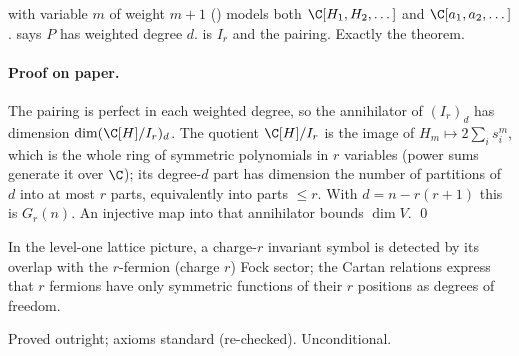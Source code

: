\begin{dictionary}
 with variable $m$ of weight $m+1$ () models both $\C[H_1,H_2,\dots]$ and $\C[a_1,a_2,\dots]$.
 says $P$ has weighted degree $d$.  is $I_r$ and  the pairing.
Exactly the theorem.
\end{dictionary}

\paragraph{Proof on paper.} The pairing is perfect in each weighted degree, so the annihilator of $(I_r)_d$ has dimension
$\dim(\C[H]/I_r)_d$. The quotient $\C[H]/I_r$ is the image of $H_m\mapsto2\sum_is_i^m$, which is the whole ring of symmetric polynomials in $r$
variables (power sums generate it over $\C$); its degree-$d$ part has dimension the number of partitions of $d$ into at most $r$ parts, equivalently
into parts $\le r$. With $d=n-r(r+1)$ this is $G_r(n)$. An injective map into that
annihilator bounds $\dim V$. \qed

\begin{physics}
In the level-one lattice picture, a charge-$r$ invariant symbol is detected by its overlap with the $r$-fermion (charge $r$) Fock sector; the
Cartan relations express that $r$ fermions have only symmetric functions of their $r$ positions as degrees of freedom.
\end{physics}

\begin{status}
Proved outright; axioms standard (re-checked). Unconditional.
\end{status}

